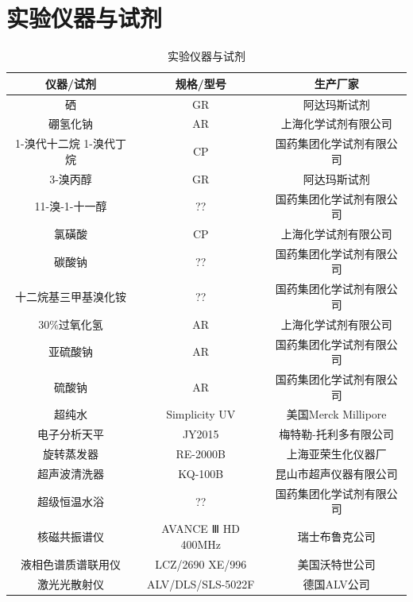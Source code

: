 \documentclass[bachelor,fandolfonts,replaceperiod]{jnuthesis}
\begin{document}
    \section{实验仪器与试剂}
        \begin{table}[htp]
        \centering
        \begin{tabular}{ccc}
            \toprule
            \textbf{仪器/试剂} & \textbf{规格/型号} & \textbf{生产厂家} \\
            \midrule
            硒   & GR & 阿达玛斯试剂 \\
            硼氢化钠  & AR  & 上海化学试剂有限公司 \\
            1-溴代十二烷
            1-溴代丁烷  & CP & 国药集团化学试剂有限公司 \\
            3-溴丙醇 & GR & 阿达玛斯试剂 \\
            11-溴-1-十一醇 & ?? & 国药集团化学试剂有限公司 \\
            氯磺酸  & CP & 上海化学试剂有限公司 \\
            碳酸钠  & ?? & 国药集团化学试剂有限公司 \\
            十二烷基三甲基溴化铵 & ?? & 国药集团化学试剂有限公司\\
            30\%过氧化氢  & AR & 上海化学试剂有限公司 \\
            亚硫酸钠  & AR & 国药集团化学试剂有限公司 \\
            硫酸钠  & AR & 国药集团化学试剂有限公司 \\
            超纯水 & Simplicity\ce{^{\textregistered}} UV & 美国Merck Millipore\\
            电子分析天平  & JY2015 & 梅特勒-托利多有限公司 \\
            旋转蒸发器  & RE-2000B & 上海亚荣生化仪器厂 \\
            超声波清洗器  & KQ-100B & 昆山市超声仪器有限公司 \\
            超级恒温水浴  & ?? & 国药集团化学试剂有限公司 \\
            核磁共振谱仪  & AVANCE Ⅲ HD 400MHz & 瑞士布鲁克公司 \\
            液相色谱质谱联用仪  & LCZ/2690 XE/996 & 美国沃特世公司 \\
            激光光散射仪 & ALV/DLS/SLS-5022F & 德国ALV公司\\
            \bottomrule
        \end{tabular}
        \caption{实验仪器与试剂}\label{table:实验仪器与试剂}
    \end{table}
\end{document}
